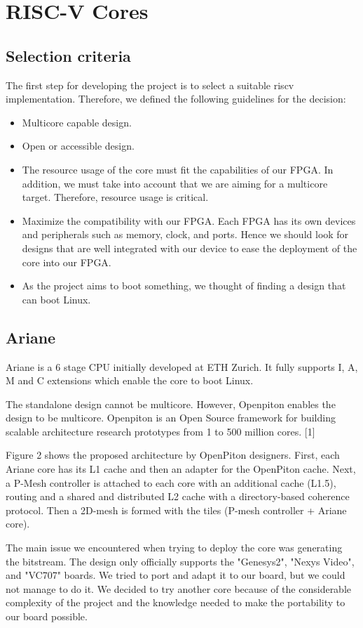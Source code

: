 \section{RISC-V Cores}

\subsection{Selection criteria}
The first step for developing the project is to select a suitable riscv implementation. Therefore, we defined the following guidelines for the decision:
\begin{itemize}
\item Multicore capable design.
\item Open or accessible design.
\item The resource usage of the core must fit the capabilities of our FPGA. In addition, we must take into account that we are aiming for a multicore target. Therefore, resource usage is critical.
\item Maximize the compatibility with our FPGA. Each FPGA has its own devices and peripherals such as memory, clock, and ports. Hence we should look for designs that are well integrated with our device to ease the deployment of the core into our FPGA.
\item As the project aims to boot something, we thought of finding a design that can boot Linux.
\end{itemize}

\subsection{Ariane}
Ariane is a 6 stage CPU initially developed at ETH Zurich. It fully supports I, A, M and C extensions which enable the core to boot Linux.

The standalone design cannot be multicore. However, Openpiton enables the design to be multicore. Openpiton is an Open Source framework for building scalable architecture research prototypes from 1 to 500 million cores. [1]

Figure 2 shows the proposed architecture by OpenPiton designers. First, each Ariane core has its L1 cache and then an adapter for the OpenPiton cache. Next, a P-Mesh controller is attached to each core with an additional cache (L1.5), routing and a shared and distributed L2 cache with a directory-based coherence protocol. Then a 2D-mesh is formed with the tiles (P-mesh controller + Ariane core). 

The main issue we encountered when trying to deploy the core was generating the bitstream. The design only officially supports the "Genesys2", "Nexys Video", and "VC707" boards. We tried to port and adapt it to our board, but we could not manage to do it. We decided to try another core because of the considerable complexity of the project and the knowledge needed to make the portability to our board possible.


